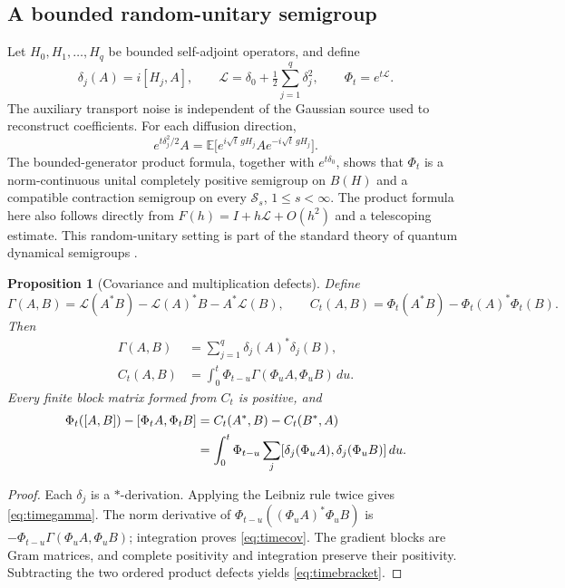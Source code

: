 \documentclass[11pt,a4paper]{amsart}
\numberwithin{equation}{section}
\newtheorem{proposition}[theorem]{Proposition}
\theoremstyle{definition}
\theoremstyle{remark}
\newcommand{\E}{\mathbb E}
\newcommand{\Sch}{\mathcal S}
\begin{document}
\subsection{A bounded random-unitary semigroup}
Let $H_0,H_1,\ldots,H_q$ be bounded self-adjoint operators, and define
\begin{equation}\label{eq:timegenerator}
 \delta_j(A)=i[H_j,A],\qquad
 \mathcal L=\delta_0+\tfrac12\sum_{j=1}^q\delta_j^2,\qquad
 \Phi_t=e^{t\mathcal L}.
\end{equation}
The auxiliary transport noise is independent of the Gaussian source used to reconstruct coefficients. For each diffusion direction,
\[
 e^{t\delta_j^2/2}A
 =\E\big[e^{i\sqrt t\,gH_j}Ae^{-i\sqrt t\,gH_j}\big].
\]
The bounded-generator product formula, together with $e^{t\delta_0}$, shows that $\Phi_t$ is a norm-continuous unital completely positive semigroup on $B(H)$ and a compatible contraction semigroup on every $\Sch_s$, $1\le s<\infty$. The product formula here also follows directly from $F(h)=I+h\mathcal L+O(h^2)$ and a telescoping estimate. This random-unitary setting is part of the standard theory of quantum dynamical semigroups \cite{Lindblad,Aniello}.

\begin{proposition}[Covariance and multiplication defects]\label{prop:timecov}
Define
\[
 \Gamma(A,B)=\mathcal L(A^*B)-\mathcal L(A)^*B-A^*\mathcal L(B),\qquad
 C_t(A,B)=\Phi_t(A^*B)-\Phi_t(A)^*\Phi_t(B).
\]
Then
\begin{align}
 \Gamma(A,B)&=\sum_{j=1}^q\delta_j(A)^*\delta_j(B),\label{eq:timegamma}\\
 C_t(A,B)&=\int_0^t\Phi_{t-u}\Gamma(\Phi_uA,\Phi_uB)\,du.\label{eq:timecov}
\end{align}
Every finite block matrix formed from $C_t$ is positive, and
\begin{align}\label{eq:timebracket}
 \Phi_t([A,B])-[\Phi_tA,\Phi_tB]
 &=C_t(A^*,B)-C_t(B^*,A)\notag\\
 &=\int_0^t\Phi_{t-u}\sum_j[\delta_j(\Phi_uA),\delta_j(\Phi_uB)]\,du.
\end{align}
\end{proposition}
\begin{proof}
Each $\delta_j$ is a $*$-derivation. Applying the Leibniz rule twice gives \eqref{eq:timegamma}. The norm derivative of
$\Phi_{t-u}((\Phi_uA)^*\Phi_uB)$
is $-\Phi_{t-u}\Gamma(\Phi_uA,\Phi_uB)$; integration proves \eqref{eq:timecov}. The gradient blocks are Gram matrices, and complete positivity and integration preserve their positivity. Subtracting the two ordered product defects yields \eqref{eq:timebracket}.
\end{proof}
\end{document}
